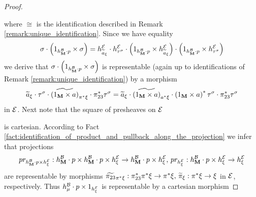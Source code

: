 \begin{proof}
\begin{center}
\begin{tikzpicture}
\end{tikzpicture}
\end{center}
where $\cong$ is the identification described in Remark \ref{remark:unique_identification}. Since we have equality
$$\sigma \cdot \left(1_{h^{\cB}_{\bd{M}}\cdot p} \times \sigma \right) = h^{\cE}_{\widetilde{a}_{\xi}}\cdot h^{\cE}_{\tau^{\sigma}}\cdot \left(1_{h^{\cB}_{\bd{M}}\cdot p} \times h^{\cE}_{\widetilde{a}_{\xi}} \right) \cdot \left(1_{h^{\cB}_{\bd{M}}\cdot p} \times h^{\cE}_{\tau^{\sigma}} \right)$$
we derive that $\sigma \cdot \left(1_{h^{\cB}_{\bd{M}}\cdot p} \times \sigma \right)$ is representable (again up to identifications of Remark \ref{remark:unique_identification}) by a morphism
$$\widetilde{a}_{\xi}\cdot \tau^{\sigma}\cdot \widetilde{\left(1_{\bd{M}}\times a\right)}_{\pi^*\xi}\cdot \pi^*_{23}\tau^\sigma = \widetilde{a}_{\xi} \cdot \widetilde{\left(1_{\bd{M}}\times a\right)}_{a^*\xi}\cdot \left(1_{\bd{M}}\times a\right)^*\tau^{\sigma}\cdot \pi^*_{23}\tau^\sigma$$
in $\cE$. Next note that the square of presheaves on $\cE$
\begin{center}
\end{center}
is cartesian. According to Fact \ref{fact:identification_of_product_and_pullback_along_the_projection} we infer that projections $$pr_{h^{\cB}_{\bd{M}}\cdot p  \times h_{\xi}^{\cE}}:h^{\cB}_{\bd{M}}\cdot p \times h^{\cB}_{\bd{M}}\cdot p  \times h_{\xi}^{\cE} \ra h^{\cB}_{\bd{M}}\cdot p  \times h_{\xi}^{\cE},\,pr_{h^{\cE}_{\xi}}:h^{\cB}_{\bd{M}}\cdot p  \times h_{\xi}^{\cE} \ra h_{\xi}^{\cE}$$
are representable by morphisms $\widetilde{\pi_{23}}_{\pi^*\xi}:\pi^*_{23}\pi^*\xi \ra \pi^*\xi,\,\widetilde{\pi}_{\xi}:\pi^*\xi\ra \xi$ in $\cE$, respectively. Thus $h^{\cB}_{\mu}\cdot p \times 1_{h^{\cE}_{\xi}}$ is representable by a cartesian morphism

\end{proof}
